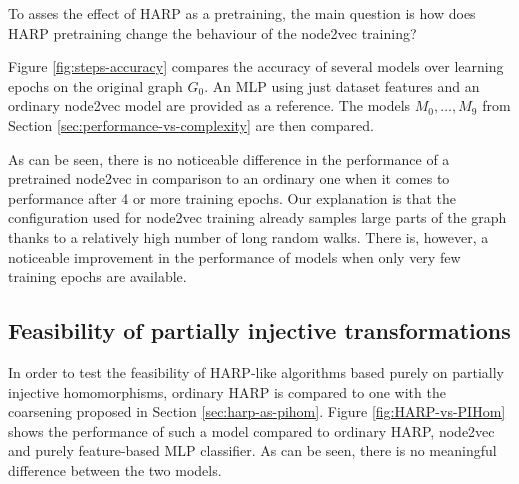 To asses the effect of HARP as a pretraining, the main question is how does HARP pretraining change the behaviour of the node2vec training?

Figure \ref{fig:steps-accuracy} compares the accuracy of several models over learning epochs on the original graph \( G_0 \). An MLP using just dataset features and an ordinary node2vec model are provided as a reference. The models \( M_0, \dots, M_9 \) from Section \ref{sec:performance-vs-complexity} are then compared.

As can be seen, there is no noticeable difference in the performance of a pretrained node2vec in comparison to an ordinary one when it comes to performance after 4 or more training epochs. Our explanation is that the configuration used for node2vec training already samples large parts of the graph thanks to a relatively high number of long random walks. There is, however, a noticeable improvement in the performance of models when only very few training epochs are available.

\subsection{Feasibility of partially injective transformations}\label{sec:harp-vs-pihom}

In order to test the feasibility of HARP-like algorithms based purely on partially injective homomorphisms, ordinary HARP is compared to one with the coarsening proposed in Section \ref{sec:harp-as-pihom}. Figure \ref{fig:HARP-vs-PIHom} shows the performance of such a model compared to ordinary HARP, node2vec and purely feature-based MLP classifier. As can be seen, there is no meaningful difference between the two models.

